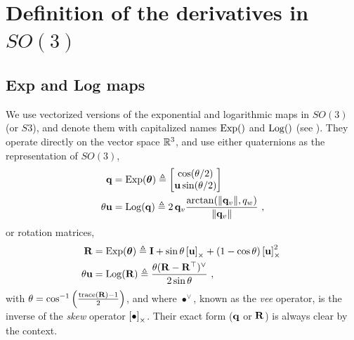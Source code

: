 
\appendices

\section{Definition of the derivatives in $SO(3)$}
\label{sec:derivatives_SO3}

\subsection{Exp and Log maps}

We use vectorized versions of the exponential and logarithmic maps in $SO(3)$ (or $S3$), and denote them with capitalized names $\operatorname*{Exp}()$ and $\operatorname*{Log}()$ (see ). They operate directly on the vector space ${\mathbb R}^3$, and use either quaternions as the representation of $SO(3)$,
%
\begin{subequations}
\begin{align}
{\bf q}
&= \operatorname*{Exp}({{\bm \theta}}) \triangleq \begin{bmatrix}
\cos(\theta/2) \\ {\bf u}\sin(\theta/2)
\end{bmatrix}\\ 
\theta{\bf u} &= \operatorname*{Log}({\bf q}) \triangleq 2\,{{\bf q}_v}\frac{\arctan({{\left\|{{\bf q}_v}\right\|},q_w})}{{\left\|{{\bf q}_v}\right\|}}
~,
\end{align}
\end{subequations}
%
or rotation matrices, 
%
\begin{subequations}
\begin{align}
{\bf R}
&= \operatorname*{Exp}({{\bm \theta}}) \triangleq {\bf I} + \sin\theta\left[{\bf u}\right]_\times + (1-\cos\theta)\left[{\bf u}\right]_\times^2~ \label{equ:rodrigues} \\ 
\theta{\bf u} &= \operatorname*{Log}({\bf R}) \triangleq \frac{\theta({\bf R}-{\bf R}^{\top})^\vee}{2\sin\theta} 
~,
\end{align}
\end{subequations}
%
with $\theta=\cos^{-1}\left(\frac{\operatorname*{trace}({\bf R})-1}{2}\right)$,
and where $\bullet^\vee$, known as the \emph{vee} operator, is the inverse of the \emph{skew} operator $\left[\bullet\right]_\times$. 
Their exact form (${\bf q}$ or ${\bf R}$) is always clear by the context.





